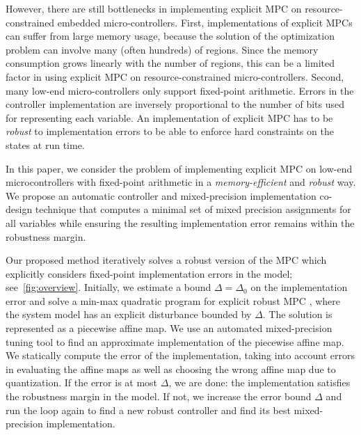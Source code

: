 However, there are still bottlenecks in implementing explicit MPC on resource-constrained embedded micro-controllers.
First, implementations of explicit MPCs can suffer from large memory usage, because the solution of the optimization
problem can involve many (often hundreds) of regions.
Since the memory consumption grows linearly with the number of regions, 
this can be a limited factor in using explicit MPC on resource-constrained micro-controllers.
Second, many low-end micro-controllers only support fixed-point arithmetic.
Errors in the controller implementation are inversely proportional to the number of bits used for representing each variable. 
An implementation of explicit MPC has to be \emph{robust} to 
implementation errors to be able to enforce hard constraints on the states at run time.

In this paper, we consider the problem of implementing explicit MPC on low-end microcontrollers with fixed-point arithmetic
in a \emph{memory-efficient} and \emph{robust} way.
We propose an automatic controller and mixed-precision implementation co-design technique that computes a minimal set  of mixed
precision assignments for all variables while ensuring the resulting implementation error remains within the robustness margin.  


Our proposed method iteratively solves a robust version of the MPC which explicitly considers fixed-point implementation errors
in the model; see~\autoref{fig:overview}.
Initially, we estimate a bound $\Delta = \Delta_0$ on the implementation error and solve a
min-max quadratic program for explicit robust MPC \cite{delaPea:2005}, where the system
model has an explicit disturbance bounded by $\Delta$.
The solution is represented as a piecewise affine map.
We use an automated mixed-precision tuning tool to find an approximate implementation of the piecewise affine
map. 
We statically compute the error of the implementation, taking into account errors
in evaluating the affine maps as well as choosing the wrong affine map due to quantization.
If the error is at most $\Delta$, we are done: the implementation satisfies the robustness margin in the model.
If not, we increase the error bound $\Delta$ and run the loop again to find a new robust controller and find its best mixed-precision
implementation.

